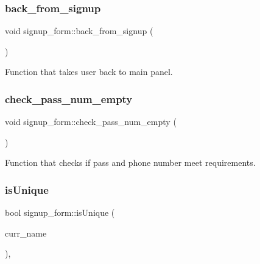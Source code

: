 \subsubsection{\texorpdfstring{back\+\_\+from\+\_\+signup}{back\_from\_signup}}
{\footnotesize\ttfamily void signup\+\_\+form\+::back\+\_\+from\+\_\+signup (\begin{DoxyParamCaption}{ }\end{DoxyParamCaption})\hspace{0.3cm}{\ttfamily [slot]}}



Function that takes user back to main panel. 

\mbox{\label{classsignup__form_a8d618167178f15d27937127a4a0efbc1}} 
\subsubsection{\texorpdfstring{check\+\_\+pass\+\_\+num\+\_\+empty}{check\_pass\_num\_empty}}
{\footnotesize\ttfamily void signup\+\_\+form\+::check\+\_\+pass\+\_\+num\+\_\+empty (\begin{DoxyParamCaption}{ }\end{DoxyParamCaption})\hspace{0.3cm}{\ttfamily [slot]}}



Function that checks if pass and phone number meet requirements. 

\mbox{\label{classsignup__form_aa1378656be593cc119db637e317a699c}} 
\subsubsection{\texorpdfstring{is\+Unique}{isUnique}}
{\footnotesize\ttfamily bool signup\+\_\+form\+::is\+Unique (\begin{DoxyParamCaption}\item[{Q\+String}]{curr\+\_\+name }\end{DoxyParamCaption})\hspace{0.3cm}{\ttfamily [static]}, {\ttfamily [slot]}}



